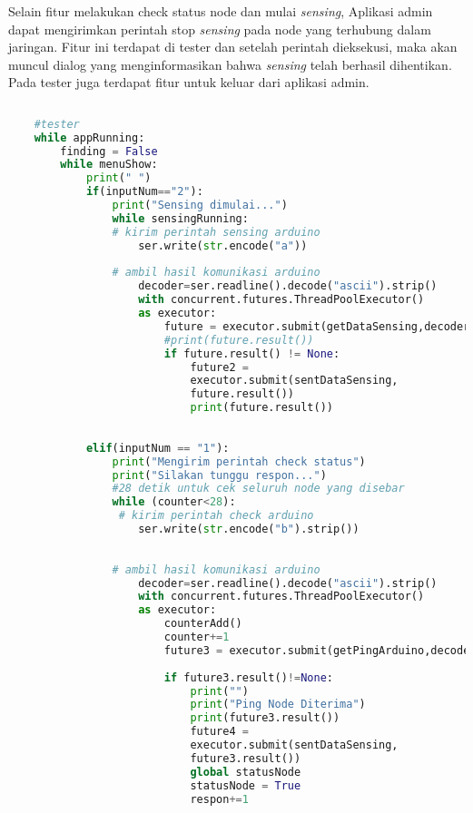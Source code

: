 \begin{itemize}
    Selain fitur melakukan check status node dan mulai \textit{sensing}, Aplikasi admin dapat mengirimkan perintah stop \textit{sensing} pada node yang terhubung dalam jaringan. Fitur ini terdapat di tester dan setelah perintah dieksekusi, maka akan muncul dialog yang menginformasikan bahwa \textit{sensing} telah berhasil dihentikan. Pada tester juga terdapat fitur untuk keluar dari aplikasi admin.

    
    \begin{lstlisting}[label=tester, language=Python, caption=Metode tester(), numbers=none]
        
    #tester
    while appRunning:
        finding = False
        while menuShow:
            print(" ")
            if(inputNum=="2"):
                print("Sensing dimulai...")
                while sensingRunning:
                # kirim perintah sensing arduino   
                    ser.write(str.encode("a"))
    
                # ambil hasil komunikasi arduino
                    decoder=ser.readline().decode("ascii").strip()
                    with concurrent.futures.ThreadPoolExecutor() 
                    as executor:  
                        future = executor.submit(getDataSensing,decoder)
                        #print(future.result())
                        if future.result() != None:
                            future2 = 
                            executor.submit(sentDataSensing, 
                            future.result())
                            print(future.result())
    
                    
            elif(inputNum == "1"):
                print("Mengirim perintah check status")
                print("Silakan tunggu respon...")
                #28 detik untuk cek seluruh node yang disebar
                while (counter<28): 
                 # kirim perintah check arduino   
                    ser.write(str.encode("b").strip())
    
    
                # ambil hasil komunikasi arduino
                    decoder=ser.readline().decode("ascii").strip()
                    with concurrent.futures.ThreadPoolExecutor() 
                    as executor:
                        counterAdd()
                        counter+=1
                        future3 = executor.submit(getPingArduino,decoder)
                        
                        if future3.result()!=None:
                            print("")
                            print("Ping Node Diterima")
                            print(future3.result())
                            future4 = 
                            executor.submit(sentDataSensing, 
                            future3.result())
                            global statusNode
                            statusNode = True
                            respon+=1
                

\end{lstlisting}
\end{itemize}
